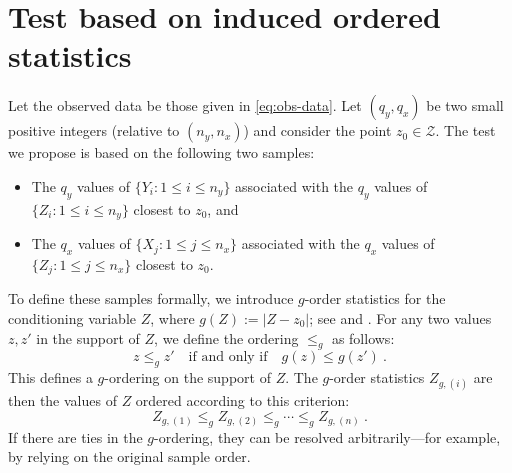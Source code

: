 \documentclass[11pt]{article}
\numberwithin{equation}{section}
\begin{document}
\section{Test based on induced ordered statistics}\label{sec:our-test}

Let the observed data be those given in \eqref{eq:obs-data}. Let $(q_y,q_x)$ be two small positive integers (relative to $(n_y,n_x)$) and consider the point $z_{0}\in \mathcal Z$. The test we propose is based on the following two samples: 
\begin{itemize}
    \item The $q_y$ values of $\{Y_i:1\le i\le n_y\}$ associated with the $q_y$ values of $\{Z_i:1\le i\le n_y\}$ closest to $z_{0}$, and 
    \item The $q_x$ values of $\{X_j:1\le j\le n_x\}$ associated with the $q_x$ values of $\{Z_j:1\le j\le n_x\}$ closest to $z_{0}$.
\end{itemize}

To define these samples formally, we introduce $g$-order statistics for the conditioning variable $Z$, where $g(Z) := |Z - z_{0}|$; see \citet[Section 2.1]{reiss:89} and \cite{kaufmann/reiss:92}. For any two values \( z, z'\) in the support of $Z$, we define the ordering \(\le_{g}\) as follows:
\[
z \le_{g} z' \quad \text{if and only if} \quad g(z) \le g(z')~.
\]
This defines a $g$-ordering on the support of $Z$. The $g$-order statistics \( Z_{g,(i)} \) are then the values of \( Z \) ordered according to this criterion:
\[
Z_{g,(1)} \le_{g} Z_{g,(2)} \le_{g} \cdots \le_{g} Z_{g,(n)}~.
\]
If there are ties in the $g$-ordering, they can be resolved arbitrarily—for example, by relying on the original sample order.
\end{document}
